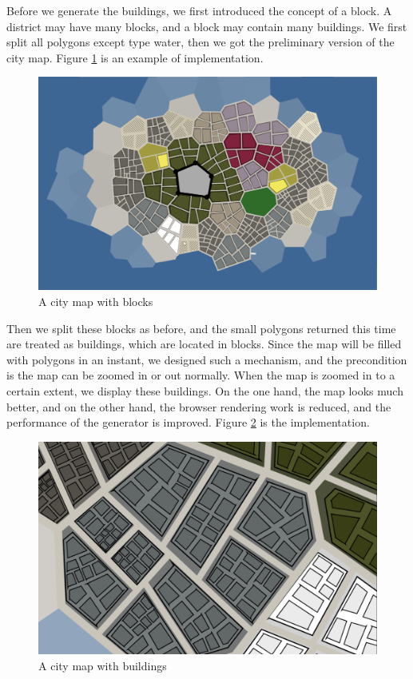 Before we generate the buildings, we first introduced the concept of a block. A district may have many blocks, and a block may contain many buildings. We first split all polygons except type water, then we got the preliminary version of the city map. Figure \ref{fig:city blocks} is an example of implementation.

\begin{figure}[htbp]
  \includegraphics[width=\textwidth]{section04/assets/Map-blocks.png}
  \caption{A city map with blocks}
  \label{fig:city blocks}
\end{figure}

Then we split these blocks as before, and the small polygons returned this time are treated as buildings, which are located in blocks. Since the map will be filled with polygons in an instant, we designed such a mechanism, and the precondition is the map can be zoomed in or out normally. When the map is zoomed in to a certain extent, we display these buildings. On the one hand, the map looks much better, and on the other hand, the browser rendering work is reduced, and the performance of the generator is improved. Figure \ref{fig:buildings} is the implementation.

\begin{figure}[htbp]
  \includegraphics[width=\textwidth]{section04/assets/Map-buildings.png}
  \caption{A city map with buildings}
  \label{fig:buildings}
\end{figure}

